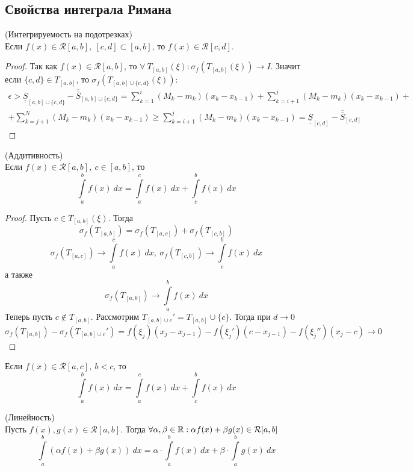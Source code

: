 \subsection{Свойства интеграла Римана}
\begin{numtheorem} (Интегрируемость на подотрезках)\\
    Если $f(x)\in \mathcal{R}[a,b],\ [c,d]\subset [a,b]$, то $f(x)\in \mathcal{R}[c,d]$.
\end{numtheorem}
\begin{proof}
    Так как $f(x)\in \mathcal{R}[a,b]$, то $\forall\ T_{[a,b]}(\xi): \sigma_f(T_{[a,b]}(\xi))\to I$. Значит если $\{c,d\}\in T_{[a,b]}$, то $\sigma_f(T_{[a,b]\cup \{c,d\}}(\xi)):$
    \begin{multline*}
        \epsilon> \underline{\underline{S}}_{[a,b]\cup \{c,d\}}-\overline{\overline{S}}_{{[a,b]\cup \{c,d\}}}=\sum\limits_{k=1}^{i}(M_k-m_k)(x_k-x_{k-1})+\sum\limits_{k=i+1}^{j}(M_k-m_k)(x_k-x_{k-1})+\\
        +\sum\limits_{k=j+1}^{N}(M_k-m_k)(x_k-x_{k-1})\geq \sum\limits_{k=i+1}^{j}(M_k-m_k)(x_k-x_{k-1})=\underline{\underline{S}}_{[c,d]}-\overline{\overline{S}}_{[c,d]}
    \end{multline*}
\end{proof}
\begin{numtheorem} (Аддитивность)\\
    Если $f(x)\in \mathcal{R}[a,b],\ c\in [a,b]$, то 
    \[\int\limits_{a}^{b}f(x)\ dx=\int\limits_{a}^{c} f(x)\ dx+\int\limits_{c}^{b}f(x)\ dx\]
\end{numtheorem}
\begin{proof}
    Пусть $c\in T_{[a,b]}(\xi)$. Тогда
    \[\sigma_f(T_{[a,b]})=\sigma_f(T_{[a,c]})+\sigma_f(T_{[c,b]})\]
    \[\sigma_f(T_{[a,c]}) \to \int\limits_{a}^{c}f(x)\ dx,\ \sigma_f(T_{[c,b]})\to \int\limits_{c}^{b}f(x)\ dx\]
    а также
    \[\sigma_f(T_{[a,b]})\to \int\limits_{a}^{b}f(x)\ dx\]
    Теперь пусть $c\not\in T_{[a,b]}$. Рассмотрим $T_{[a,b]\cup c}'=T_{[a,b]}\cup \{c\}$. Тогда при $d\to 0$
        \[\sigma_f(T_{[a,b]})-\sigma_f(T_{[a,b]\cup c}')=f(\xi_j)(x_j-x_{j-1})-f(\xi_j')(c-x_{j-1})-f(\xi_j'')(x_j-c)\to 0\]
\end{proof} 
\begin{comm}
    Если $f(x)\in \mathcal{R}[a,c],\ b<c$, то
    \[\int\limits_{a}^{b}f(x)\ dx=\int\limits_{a}^{c}f(x)\ dx+\int\limits_{c}^{b}f(x)\ dx\]
\end{comm} 
\begin{numtheorem} (Линейность)\\
    Пусть $f(x),g(x)\in \mathcal{R}[a,b]$. Тогда $\forall \alpha,\beta \in \mathbb{R}: \alpha f(x)+\beta g(x) \in \mathcal{R}[a,b]$
    \[\int\limits_{a}^{b}(\alpha f(x)+\beta g(x))\ dx=\alpha\cdot \int\limits_{a}^{b} f(x)\ dx+\beta\cdot \int\limits_{a}^{b}g(x)\ dx\]
\end{numtheorem}
